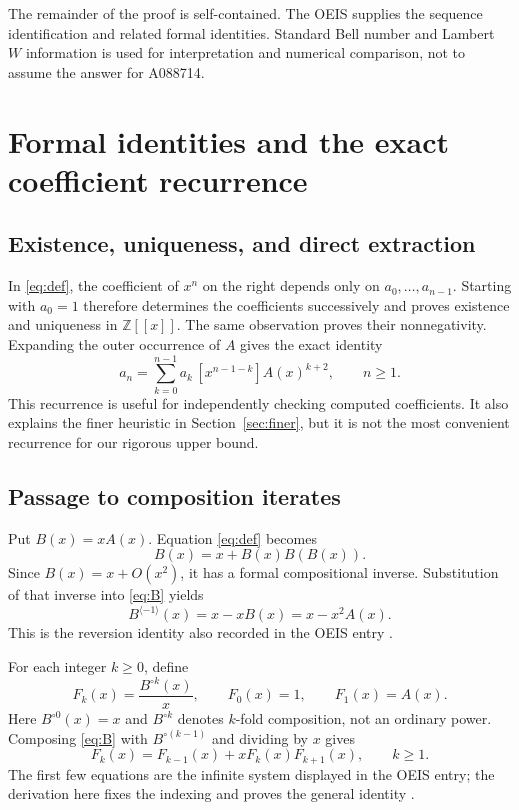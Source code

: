 \documentclass[11pt]{article}
\numberwithin{equation}{section}
\theoremstyle{remark}
\begin{document}
The remainder of the proof is self-contained. The OEIS supplies the
sequence identification and related formal identities. Standard Bell
number and Lambert $W$ information is used for interpretation and
numerical comparison, not to assume the answer for A088714.

\section{Formal identities and the exact coefficient recurrence}

\subsection{Existence, uniqueness, and direct extraction}

In \eqref{eq:def}, the coefficient of $x^n$ on the right depends only on
$a_0,\ldots,a_{n-1}$. Starting with $a_0=1$ therefore determines the
coefficients successively and proves existence and uniqueness in
$\mathbb Z[[x]]$. The same observation proves their nonnegativity.
Expanding the outer occurrence of $A$ gives the exact identity
\begin{equation}\label{eq:directrec}
 a_n=\sum_{k=0}^{n-1}a_k\,[x^{n-1-k}]A(x)^{k+2},\qquad n\ge1.
\end{equation}
This recurrence is useful for independently checking computed
coefficients. It also explains the finer heuristic in
Section~\ref{sec:finer}, but it is not the most convenient recurrence for
our rigorous upper bound.

\subsection{Passage to composition iterates}

Put $B(x)=xA(x)$. Equation \eqref{eq:def} becomes
\begin{equation}\label{eq:B}
 B(x)=x+B(x)B(B(x)).
\end{equation}
Since $B(x)=x+O(x^2)$, it has a formal compositional inverse. Substitution
of that inverse into \eqref{eq:B} yields
\begin{equation}\label{eq:inverse}
 B^{\langle-1\rangle}(x)=x-xB(x)=x-x^2A(x).
\end{equation}
This is the reversion identity also recorded in the OEIS entry
\cite{oeis-a088714}.

For each integer $k\ge0$, define
\begin{equation}\label{eq:Fk}
 F_k(x)=\frac{B^{\circ k}(x)}x,
 \qquad F_0(x)=1,
 \qquad F_1(x)=A(x).
\end{equation}
Here $B^{\circ0}(x)=x$ and $B^{\circ k}$ denotes $k$-fold composition,
not an ordinary power. Composing \eqref{eq:B} with $B^{\circ(k-1)}$ and
dividing by $x$ gives
\begin{equation}\label{eq:hierarchy}
 F_k(x)=F_{k-1}(x)+xF_k(x)F_{k+1}(x),\qquad k\ge1.
\end{equation}
The first few equations are the infinite system displayed in the OEIS
entry; the derivation here fixes the indexing and proves the general
identity \cite{oeis-a088714}.
\end{document}
